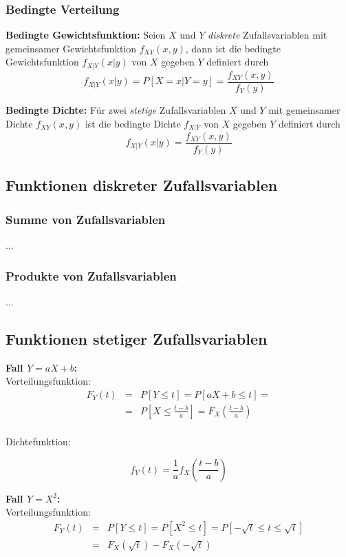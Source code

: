 \documentclass[10pt,a4paper,twocolumn]{article}
\begin{document}
\subsubsection{Bedingte Verteilung}
\textbf{Bedingte Gewichtsfunktion:} Seien $X$ und $Y$ \emph{diskrete} Zufallsvariablen mit gemeinsamer Gewichtsfunktion $f_{XY}(x,y)$, dann ist die bedingte Gewichtsfunktion $f_{X|Y}(x|y)$ von $X$ gegeben $Y$ definiert durch
\[
f_{X|Y}(x|y)=P[X=x|Y=y]=\frac{f_{XY}(x,y)}{f_Y(y)}
\]

\textbf{Bedingte Dichte:} Für zwei \emph{stetige} Zufallsvariablen $X$ und $Y$ mit gemeinsamer Dichte $f_{XY}(x,y)$ ist die bedingte Dichte $f_{X|Y}$ von $X$ gegeben $Y$ definiert durch
\[
f_{X|Y}(x|y)=\frac{f_{XY}(x,y)}{f_Y(y)}
\]

\subsection{Funktionen diskreter Zufallsvariablen}

\subsubsection{Summe von Zufallsvariablen}
...

\subsubsection{Produkte von Zufallsvariablen}
...

\subsection{Funktionen stetiger Zufallsvariablen}
\textbf{Fall \boldmath$Y=aX+b$:} \\
Verteilungsfunktion:
\[
\begin{array}{rcl}
	F_Y(t) & = & P[Y\leq t]=P[aX+b\leq t]= \\
	& = & P[X\leq \frac{t-b}{a}]=F_X(\frac{t-b}{a}) \\
\end{array}
\]

Dichtefunktion:

\[
f_Y(t)=\frac{1}{a}f_X\left(\frac{t-b}{a}\right)
\]

\textbf{Fall \boldmath$Y=X^2$:} \\
Verteilungsfunktion:
\[
\begin{array}{rcl}
	F_Y(t) & = & P[Y\leq t]=P[X^2\leq t]=P[-\sqrt{t}\leq t\leq\sqrt{t}] \\
	& = & F_X(\sqrt{t})-F_X(-\sqrt{t}) \\
\end{array}
\]
\end{document}
